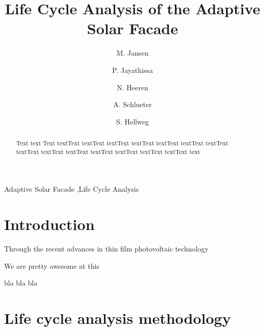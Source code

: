 \documentclass[preprint,12pt]{elsarticle}
\begin{document}
\begin{frontmatter}

\title{Life Cycle Analysis of the Adaptive Solar Facade} 

\author[ita]{M. Jansen}

\author[ita]{P. Jayathissa}

\author[baug]{N. Heeren}

\author[ita]{A. Schlueter}

\author[baug]{S. Hellweg}


\address[ita]{Architecture and Building Systems, Institute of Technology in Architecture,\\ ETH Zurich, Switzerland} 
\address[baug]{Ecological System Design, Institute of Environmental Engineering,\\ ETH Zurich, Switzerland}

\begin{abstract}
Text text Text textText textText textText textText textText textText textText textText textText textText textText textText textText textText text
\end{abstract}

\begin{keyword}
Adaptive Solar Facade \sep Life Cycle Analysis
\end{keyword}

\end{frontmatter}

\section{Introduction}
\label{introduction}

Through the recent advances in thin film photovoltaic technology 

We are pretty awesome at this

bla bla bla

\section{Life cycle analysis methodology}
\label{method}
\end{document}
